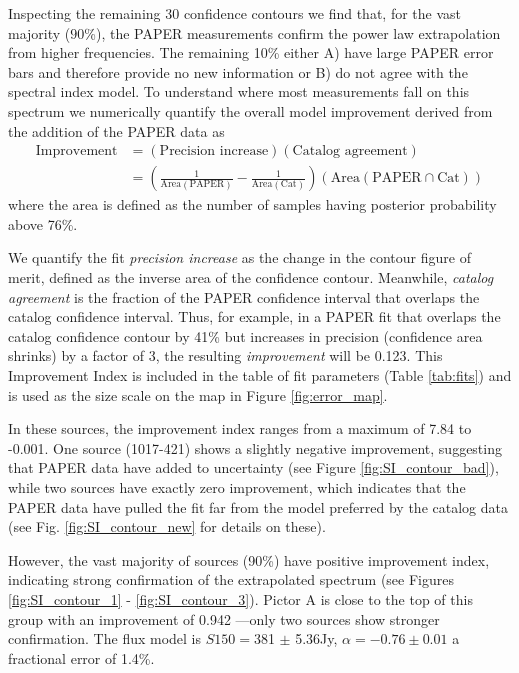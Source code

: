 \documentclass[preprint]{aastex}
\newcommand{\PAPER}{\mathrm{PAPER}}
\begin{document}
Inspecting the remaining 30 confidence contours we find that, for the vast majority ($
90$\%), the PAPER measurements confirm the power law extrapolation from higher
frequencies. The remaining 10\% either A) have large PAPER error bars and
therefore provide no new information or B) do not agree with the spectral index
model.  To understand where most measurements fall on this spectrum we
numerically quantify the overall model improvement derived from the addition of
the PAPER data as 
\begin{align}
\textrm{Improvement} &= \left(\textrm{Precision increase}\right) \left(\textrm{Catalog agreement}\right)\\
&= \left(\frac{1}{\textrm{Area}(\textrm{PAPER})} - \frac{1}{\textrm{Area}(\textrm{Cat})}\right) \left( \textrm{Area}(\PAPER \cap \textrm{Cat}) \right)
\end{align}
where the area is defined as the number of samples having posterior probability above 76\%.

We quantify the fit {\em precision increase} as the change in the contour
figure of merit, defined as the inverse area of the confidence contour.
Meanwhile, {\em catalog agreement} is the fraction of the PAPER confidence
interval that overlaps the catalog confidence interval.  Thus, for example, in
a PAPER fit that overlaps the catalog confidence contour by 41\% but increases
in precision (confidence area shrinks) by a factor of 3, the resulting {\em
improvement} will be 0.123.  This Improvement Index is included in the table
of fit parameters (Table \ref{tab:fits}) and is used as the size scale on the 
map in Figure \ref{fig:error_map}.

In these sources, the improvement index ranges from a maximum of 7.84  to -0.001.
One source (1017-421) shows a slightly negative improvement, suggesting that PAPER data have
added to uncertainty (see Figure \ref{fig:SI_contour_bad}), while two sources
have exactly zero improvement, which indicates that the PAPER data have pulled
the fit far from the model preferred by the catalog data (see Fig.
\ref{fig:SI_contour_new} for details on these).  

However, the vast majority of sources (90\%) have positive improvement index,
indicating strong confirmation of the extrapolated spectrum (see Figures
\ref{fig:SI_contour_1} - \ref{fig:SI_contour_3}).  Pictor A is close to the top of
this group  with an improvement of 0.942 ---only two sources show stronger
confirmation.  The flux model is $S150=$381 $\pm$ 5.36Jy, $\alpha=-0.76\pm0.01$
 a fractional error of 1.4\%.
\end{document}
